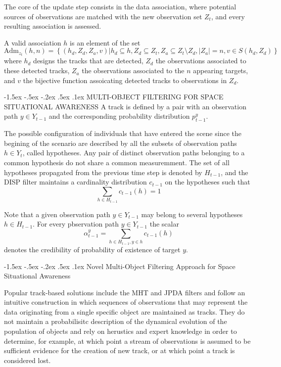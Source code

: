 \documentclass[a4paper, 11pt]{article}
\makeatletter
\newcommand{\sihao}{\fontsize{14pt}{\baselineskip}\selectfont}
\renewcommand\section{\@startsection{section}{1}{\z@}%
{-1.5ex \@plus -.5ex \@minus -.2ex}%
{.5ex \@plus .1ex}%
{\normalfont\sihao\CJKfamily{hei}}}
\makeatother
\begin{document}
\begin{CJK}{UTF8}{gbsn}
The core of the update step consists in the data association, where potential sources of observations are matched with the new observation set $Z_t$, and every resulting association is assessed.

A valid association $h$ is an element of the set
\[
\text{Adm}_{z_t}(h,n) = \left\{(h_d,Z_d,Z_a,v)|h_d \subseteq h, Z_d \subseteq Z_t ,Z_a \subseteq Z_t \setminus Z_d, |Z_a| = n, v \in S(h_d,Z_d) \right\}
\]
where $h_d$ designs the tracks that are detected, $Z_d$ the observations associated to these detected tracks, $Z_a$ the observations associated to the $n$ appearing targets, and $v$ the bijective function assoicating detected tracks to observations in $Z_d$.


\section{MULTI-OBJECT FILTERING FOR SPACE SITUATIONAL
AWARENESS}
A track is defined by a pair with an observation path $y \in Y_{t-1}$ and the corresponding probability distribution $p_{t-1}^y$.

The possible configuration of individuals that have entered the scene since the begining of the scenario are described by all the subsets of observation paths $h \in Y_t$, called hypotheses. Any pair of distinct observation paths belonging to a common hypothesis   do not share a common measuremment. The set of all hypotheses propagated from the previous time step is denoted by $H_{t-1}$, and the DISP filter maintains a cardinality distribution $c_{t-1}$ on the hypotheses such that
\[
\sum_{h\in H_{t-1}} c_{t-1}(h) = 1
\]

Note that a given observation path $y \in Y_{t-1}$ may belong to several hypotheses $h \in H_{t-1}$. For every pbservation path $y \in Y_{t-1}$ the scalar
\[
\alpha_{t-1}^y = \sum_{h \in H_{t-1}, y\in h} c_{t-1}(h)
\]
denotes the credibility of probability of existence of target $y$.



\section{Novel Multi-Object Filtering Approach for Space
Situational Awareness}

Popular track-based solutions include the MHT and JPDA filters and follow an intuitive construction in which sequences of observations that may represent the data originating from a single specific object are maintained as tracks. They do not maintain a probabilisitc description of the dynamical evolution of the population of objects and rely on herustics and expert knowledge in order to determine, for example, at which point a stream of observations is assumed to be sufficient evidence for the creation of new track, or at which point a track is considered lost.


\end{CJK}
\end{document}
